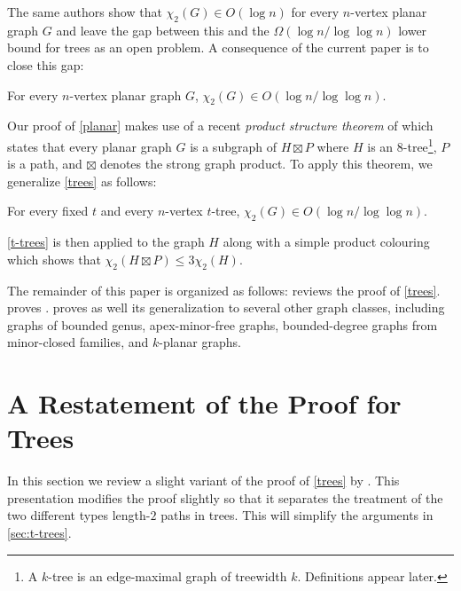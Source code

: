 \documentclass[kpfonts]{patmorin}
\newcommand{\uqs}{\chi_2}
\begin{document}
The same authors show that $\uqs(G)\in O(\log n)$ for every $n$-vertex planar graph $G$ and leave the gap between this and the $\Omega(\log n/\log\log n)$ lower bound for trees as an open problem.  A consequence of the current paper is to close this gap:

\begin{thm}\label{planar}
    For every $n$-vertex planar graph $G$, $\uqs(G)\in O(\log n/\log\log n)$.
\end{thm}

Our proof of \cref{planar} makes use of a recent \emph{product structure theorem} of \citet{dujmovic.joret.ea:planar} which states that every planar graph $G$ is a subgraph of $H\boxtimes P$ where $H$ is an $8$-tree\footnote{A $k$-tree is an edge-maximal graph of treewidth $k$. Definitions appear later.}, $P$ is a path, and $\boxtimes$ denotes the strong graph product.  To apply this theorem, we generalize \cref{trees} as follows:

\begin{thm}\label{t-trees}
    For every fixed $t$ and every $n$-vertex $t$-tree, $\uqs(G) \in O(\log n/\log\log n)$.
\end{thm}

\cref{t-trees} is then applied to the graph $H$ along with a simple product colouring which shows that $\uqs(H\boxtimes P)\le 3\uqs(H)$.

The remainder of this paper is organized as follows:  reviews the proof of \cref{trees}.  proves .   proves  as well its generalization to several other graph classes, including graphs of bounded genus, apex-minor-free graphs, bounded-degree graphs from minor-closed families, and $k$-planar graphs.




\section{A Restatement of the Proof for Trees}

In this section we review a slight variant of the proof of \cref{trees} by \citet{karpas.neiman.ea:on}. This presentation modifies the proof slightly so that it separates the treatment of the two different types length-$2$ paths in trees. This will simplify the arguments in \cref{sec:t-trees}.
\end{document}
